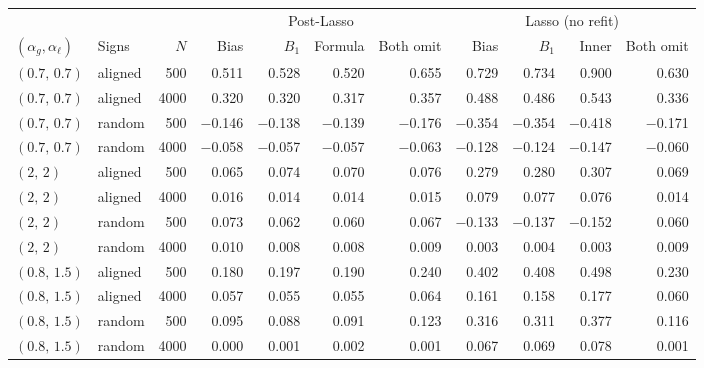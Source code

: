 \begin{tabular}{ll r rrrr rrrr}
\toprule
 & & & \multicolumn{4}{c}{Post-Lasso} & \multicolumn{4}{c}{Lasso (no refit)} \\
\cmidrule(lr){4-7} \cmidrule(lr){8-11}
$(\alpha_g,\alpha_\ell)$ & Signs & $N$ & Bias & $B_1$ & Formula & Both omit & Bias & $B_1$ & Inner & Both omit \\
\midrule
$(0.7,\,0.7)$ & aligned & 500 & 0.511 & 0.528 & 0.520 & 0.655 & 0.729 & 0.734 & 0.900 & 0.630 \\
$(0.7,\,0.7)$ & aligned & 4000 & 0.320 & 0.320 & 0.317 & 0.357 & 0.488 & 0.486 & 0.543 & 0.336 \\
$(0.7,\,0.7)$ & random & 500 & $-$0.146 & $-$0.138 & $-$0.139 & $-$0.176 & $-$0.354 & $-$0.354 & $-$0.418 & $-$0.171 \\
$(0.7,\,0.7)$ & random & 4000 & $-$0.058 & $-$0.057 & $-$0.057 & $-$0.063 & $-$0.128 & $-$0.124 & $-$0.147 & $-$0.060 \\
\addlinespace
$(2,\,2)$ & aligned & 500 & 0.065 & 0.074 & 0.070 & 0.076 & 0.279 & 0.280 & 0.307 & 0.069 \\
$(2,\,2)$ & aligned & 4000 & 0.016 & 0.014 & 0.014 & 0.015 & 0.079 & 0.077 & 0.076 & 0.014 \\
$(2,\,2)$ & random & 500 & 0.073 & 0.062 & 0.060 & 0.067 & $-$0.133 & $-$0.137 & $-$0.152 & 0.060 \\
$(2,\,2)$ & random & 4000 & 0.010 & 0.008 & 0.008 & 0.009 & 0.003 & 0.004 & 0.003 & 0.009 \\
\addlinespace
$(0.8,\,1.5)$ & aligned & 500 & 0.180 & 0.197 & 0.190 & 0.240 & 0.402 & 0.408 & 0.498 & 0.230 \\
$(0.8,\,1.5)$ & aligned & 4000 & 0.057 & 0.055 & 0.055 & 0.064 & 0.161 & 0.158 & 0.177 & 0.060 \\
$(0.8,\,1.5)$ & random & 500 & 0.095 & 0.088 & 0.091 & 0.123 & 0.316 & 0.311 & 0.377 & 0.116 \\
$(0.8,\,1.5)$ & random & 4000 & 0.000 & 0.001 & 0.002 & 0.001 & 0.067 & 0.069 & 0.078 & 0.001 \\
\bottomrule
\end{tabular}
